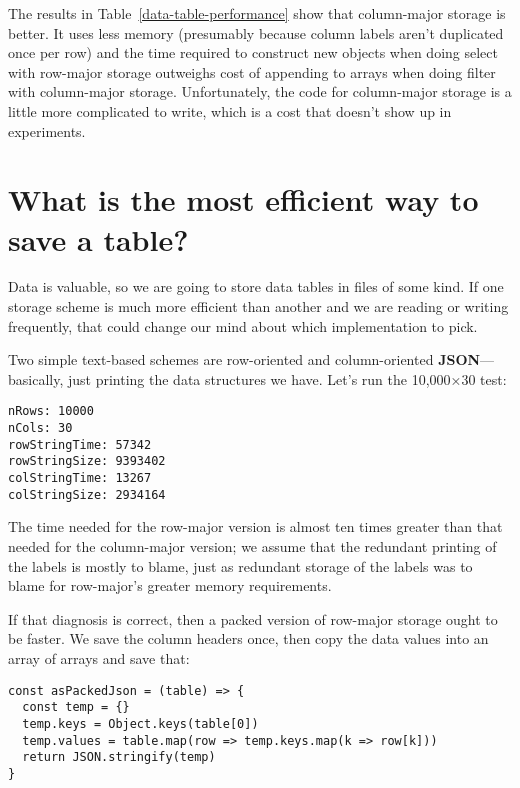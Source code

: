 \documentclass[krantzl]{krantz}
\newcommand{\tblref}[1]{Table~\ref{#1}}
\newcommand{\glossref}[1]{\textbf{#1}}
\begin{document}
The results in \tblref{data-table-performance} show that column-major storage is better.
It uses less memory (presumably because column labels aren’t duplicated once per row)
and the time required to construct new objects when doing select with row-major storage
outweighs cost of appending to arrays when doing filter with column-major storage.
Unfortunately,
the code for column-major storage is a little more complicated to write,
which is a cost that doesn’t show up in experiments.

\section{What is the most efficient way to save a table?}\label{data-table-save}


Data is valuable,
so we are going to store data tables in files of some kind.
If one storage scheme is much more efficient than another and we are reading or writing frequently,
that could change our mind about which implementation to pick.


Two simple text-based schemes are row-oriented and column-oriented \glossref{JSON}—basically,
just printing the data structures we have.
Let’s run the 10,000×30 test:


\begin{lstlisting}[frame=tblr,backgroundcolor=\color{black!5}]
nRows: 10000
nCols: 30
rowStringTime: 57342
rowStringSize: 9393402
colStringTime: 13267
colStringSize: 2934164
\end{lstlisting}



The time needed for the row-major version is almost ten times greater than
that needed for the column-major version;
we assume that the redundant printing of the labels is mostly to blame,
just as redundant storage of the labels was to blame for row-major’s greater memory requirements.


If that diagnosis is correct,
then a packed version of row-major storage ought to be faster.
We save the column headers once,
then copy the data values into an array of arrays and save that:


\begin{lstlisting}[frame=tblr]
const asPackedJson = (table) => {
  const temp = {}
  temp.keys = Object.keys(table[0])
  temp.values = table.map(row => temp.keys.map(k => row[k]))
  return JSON.stringify(temp)
}
\end{lstlisting}
\end{document}
